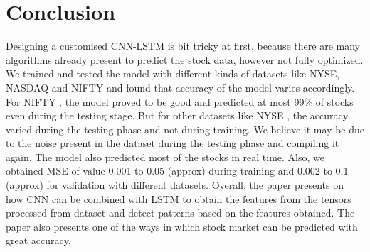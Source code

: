 \documentclass[conference]{IEEEtran}
\begin{document}
\section {Conclusion}
Designing a customised CNN-LSTM is bit tricky at first, because there are many algorithms already present to predict the stock data, however not fully optimized. We trained and tested the model with different kinds of datasets like NYSE, NASDAQ and NIFTY and found that accuracy of the model varies accordingly. For NIFTY \cite {b11}, the model proved to be good and predicted at most 99\% of stocks even during the testing stage. But for other datasets like NYSE \cite{b12}, the accuracy varied during the testing phase and not during training. We believe it may be due to the noise present in the dataset during the testing phase and compiling it again. The model also predicted most of the stocks in real time. Also, we obtained MSE of value 0.001 to 0.05 (approx) during training and 0.002 to 0.1 (approx) for validation with different datasets. Overall, the paper presents on how CNN can be combined with LSTM to obtain the features from the tensors processed from dataset and detect patterns based on the features obtained. The paper also presents one of the ways in which stock market can be predicted with great accuracy.
\end{document}
